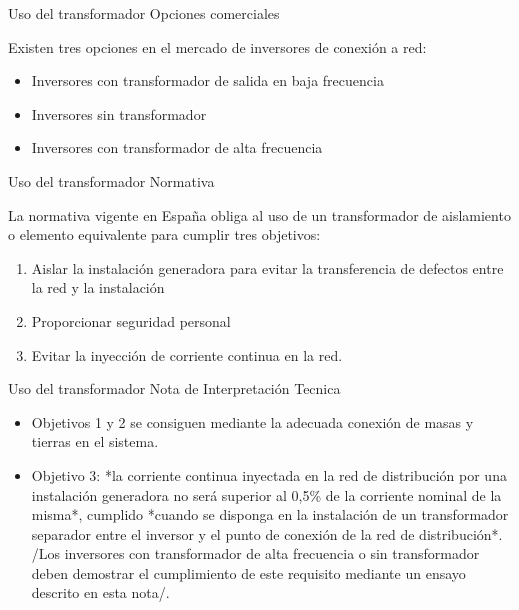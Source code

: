\documentclass[xcolor={usenames,svgnames,dvipsnames}]{beamer}
\begin{document}
\begin{frame}[label=sec-2-0-16]{Uso del transformador}
Opciones comerciales

Existen tres opciones en el mercado de inversores de conexión a red:

\begin{itemize}
\item Inversores con transformador de salida en baja frecuencia

\item Inversores sin transformador

\item Inversores con transformador de alta frecuencia
\end{itemize}
\end{frame}

\begin{frame}[label=sec-2-0-17]{Uso del transformador}
Normativa

La normativa vigente en España obliga al uso de un transformador de
aislamiento o elemento equivalente para cumplir tres objetivos:

\begin{enumerate}
\item Aislar la instalación generadora para evitar la transferencia de
defectos entre la red y la instalación

\item Proporcionar seguridad personal

\item Evitar la inyección de corriente continua en la red.
\end{enumerate}
\end{frame}

\begin{frame}[label=sec-2-0-18]{Uso del transformador}
Nota de Interpretación Tecnica

\begin{itemize}
\item Objetivos 1 y 2 se consiguen mediante la adecuada conexión de masas y
tierras en el sistema.

\item Objetivo 3: \guillemotleft{}*la corriente continua inyectada en la red de
distribución por una instalación generadora no será superior al 0,5\%
de la corriente nominal de la misma*\guillemotright{}, cumplido \guillemotleft{}*cuando se disponga
en la instalación de un transformador separador entre el inversor y
el punto de conexión de la red de distribución*\guillemotright{}. /Los inversores con
transformador de alta frecuencia o sin transformador deben demostrar
el cumplimiento de este requisito mediante un ensayo descrito en esta
nota/.
\end{itemize}
\end{frame}
\end{document}
